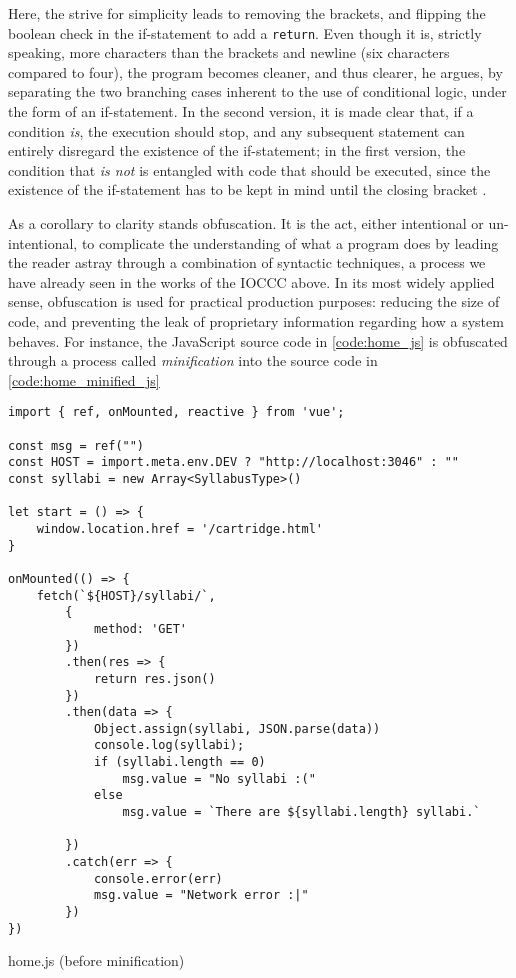 Here, the strive for simplicity leads to removing the brackets, and flipping the boolean check in the if-statement to add a \lstinline{return}. Even though it is, strictly speaking, more characters than the brackets and newline (six characters compared to four), the program becomes cleaner, and thus clearer, he argues, by separating the two branching cases inherent to the use of conditional logic, under the form of an if-statement. In the second version, it is made clear that, if a condition \emph{is}, the execution should stop, and any subsequent statement can entirely disregard the existence of the if-statement; in the first version, the condition that \emph{is not} is entangled with code that should be executed, since the existence of the if-statement has to be kept in mind until the closing bracket \citep{bush_15_2015}.

As a corollary to clarity stands obfuscation. It is the act, either intentional or un-intentional, to complicate the understanding of what a program does by leading the reader astray through a combination of syntactic techniques, a process we have already seen in the works of the IOCCC above. In its most widely applied sense, obfuscation is used for practical production purposes: reducing the size of code, and preventing the leak of proprietary information regarding how a system behaves. For instance, the JavaScript source code in \ref{code:home_js} is obfuscated through a process called \emph{minification} into the source code in \ref{code:home_minified_js}

\begin{listing}
  \begin{verbatim}
import { ref, onMounted, reactive } from 'vue';

const msg = ref("")
const HOST = import.meta.env.DEV ? "http://localhost:3046" : ""
const syllabi = new Array<SyllabusType>()

let start = () => {
    window.location.href = '/cartridge.html'
}

onMounted(() => {
    fetch(`${HOST}/syllabi/`,
        {
            method: 'GET'
        })
        .then(res => {
            return res.json()
        })
        .then(data => {
            Object.assign(syllabi, JSON.parse(data))
            console.log(syllabi);
            if (syllabi.length == 0)
                msg.value = "No syllabi :("
            else
                msg.value = `There are ${syllabi.length} syllabi.`

        })
        .catch(err => {
            console.error(err)
            msg.value = "Network error :|"
        })
})
\end{verbatim}
  \caption{home.js (before minification)}
  \label{code:home_js}
\end{listing}

